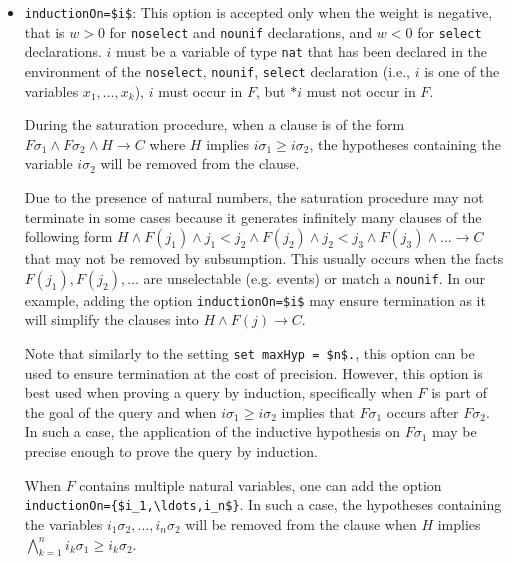 \documentclass{book}
\begin{document}
\begin{itemize}

By looking at the output of the execution of \texttt{{\docexdir}ex\_induction\_group\_proof.pv}, one can notice that ProVerif is able to prove all queries and in particular, it generates the following reachable goals for the query \lstinline!mess(d_Q,i) ==> is_nat(i)!:
\begin{lstlisting}[numbers=none]
goal reachable: is_nat(i_2) && mess(d_Q[],i_2) -> mess(d_Q[],i_2 + 1)
goal reachable: mess(d_Q[],0)
\end{lstlisting}


\item \lstinline{inductionOn=$i$}:
This option is accepted only when the weight is negative, that is $w > 0$ for \lstinline{noselect} and \lstinline{nounif} declarations, and $w <0$ for \lstinline{select} declarations.
$i$ must be a variable of type \lstinline!nat! that has been declared in the environment of the \lstinline{noselect}, \lstinline!nounif!, \lstinline{select} declaration (i.e., $i$ is one of the variables $x_1,\ldots, x_k$), $i$ must occur in $F$, but $*i$ must not occur in $F$.

During the saturation procedure, when a clause is of the form $F\sigma_1 \wedge F\sigma_2 \wedge H \rightarrow C$ where $H$ implies $i\sigma_1 \geq i\sigma_2$, the hypotheses containing the variable $i\sigma_2$ will be removed from the clause.

Due to the presence of natural numbers, the saturation procedure may not terminate in some cases because it generates infinitely many clauses of the following form
$H \wedge F(j_1) \wedge j_1 < j_2 \wedge F(j_2) \wedge j_2 < j_3 \wedge F(j_3) \wedge \ldots \rightarrow C$ that may not be removed by subsumption. This usually occurs when the facts $F(j_1),F(j_2), \ldots$ are unselectable (e.g. events) or match a \lstinline!nounif!. In our example, adding the option \lstinline!inductionOn=$i$! may ensure termination as it will simplify the clauses into $H \wedge F(j) \rightarrow C$.

Note that similarly to the setting \lstinline{set maxHyp = $n$.}, this option can be used to ensure termination at the cost of precision. However, this option is best used when proving a query by induction, specifically when $F$ is part of the goal of the query and when $i\sigma_1 \geq i\sigma_2$ implies that $F\sigma_1$ occurs after $F\sigma_2$. In such a case, the application of the inductive hypothesis on $F\sigma_1$ may be precise enough to prove the query by induction.

When $F$ contains multiple natural variables, one can add the option \lstinline!inductionOn={$i_1,\ldots,i_n$}!. In such a case, the hypotheses containing the variables $i_1\sigma_2,\ldots, i_n\sigma_2$ will be removed from the clause when $H$ implies $\bigwedge_{k=1}^n i_k\sigma_1 \geq i_k\sigma_2$.
\end{itemize}
\end{document}
